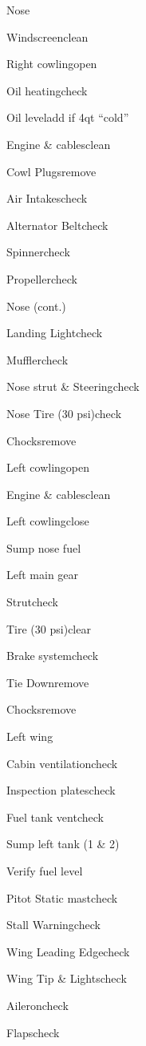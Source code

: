 \begin{multicols}{2}
\begin{checklist}{Nose}
  \item{Windscreen}{clean}
  \item{Right cowling}{open}
  \item{Oil heating}{check}
  \item{Oil level}{add if 4qt ``cold''}
  \item{Engine \& cables}{clean}
  \item{Cowl Plugs}{remove}
  \item{Air Intakes}{check}
  \item{Alternator Belt}{check}
  \item{Spinner}{check}
  \item{Propeller}{check}
\end{checklist}

\begin{checklist}{Nose (cont.)}
  \item{Landing Light}{check}
  \item{Muffler}{check}
  \item{Nose strut \& Steering}{check}
  \item{Nose Tire (30 psi)}{check}
  \item{Chocks}{remove}
  \item{Left cowling}{open}
  \item{Engine \& cables}{clean}
  \item{Left cowling}{close}
  \item{Sump nose fuel}{}
\end{checklist}

\begin{checklist}{Left main gear}
  \item{Strut}{check}
  \item{Tire (30 psi)}{clear}
  \item{Brake system}{check}
  \item{Tie Down}{remove}
  \item{Chocks}{remove}
\end{checklist}

\begin{checklist}{Left wing}
  \item{Cabin ventilation}{check}
  \item{Inspection plates}{check}
  \item{Fuel tank vent}{check}
  \item{Sump left tank (1 \& 2)}{}
  \item{Verify fuel level}{}
  \item{Pitot Static mast}{check}
  \item{Stall Warning}{check}
  \item{Wing Leading Edge}{check}
  \item{Wing Tip \& Lights}{check}
  \item{Aileron}{check}
  \item{Flaps}{check}
\end{checklist}


\end{multicols}

